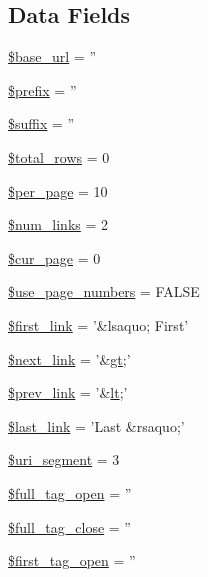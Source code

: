 \subsection*{Data Fields}
\begin{DoxyCompactItemize}
\item 
\hyperlink{class_c_i___pagination_a6886427c9c643f707fcb35c018049bc7}{\$base\-\_\-url} = ''
\item 
\hyperlink{class_c_i___pagination_a09e8cf95b9d29955a0bfabca9b420edc}{\$prefix} = ''
\item 
\hyperlink{class_c_i___pagination_a8a4ee1ac7ecdf8ef590598ad43b23e0a}{\$suffix} = ''
\item 
\hyperlink{class_c_i___pagination_af2c641e024ee7eeec68ae26c08ca2cf2}{\$total\-\_\-rows} = 0
\item 
\hyperlink{class_c_i___pagination_abece0f3099457a037f8f339811dc6e20}{\$per\-\_\-page} = 10
\item 
\hyperlink{class_c_i___pagination_aa04c33b46d7b63638408ac57ca3ee9e9}{\$num\-\_\-links} = 2
\item 
\hyperlink{class_c_i___pagination_a0114271d3cbbe963a73efe317e3512c7}{\$cur\-\_\-page} = 0
\item 
\hyperlink{class_c_i___pagination_ac19b7d290389a9188ca6466f85d14a85}{\$use\-\_\-page\-\_\-numbers} = F\-A\-L\-S\-E
\item 
\hyperlink{class_c_i___pagination_a0236d9345031b8c11db487560609f9a7}{\$first\-\_\-link} = '\&lsaquo; First'
\item 
\hyperlink{class_c_i___pagination_ae3962413e69384df902aedf7484ddefe}{\$next\-\_\-link} = '\&\hyperlink{mathquill_8js_afcd9bd0e48d31b4d384b46d471e50ab4}{gt};'
\item 
\hyperlink{class_c_i___pagination_afab5c29a3da82c4dce6a491f1d257831}{\$prev\-\_\-link} = '\&\hyperlink{mathquill_8js_ac2b9298bcc3d72ed2a56e0ba03bc909a}{lt};'
\item 
\hyperlink{class_c_i___pagination_ab10d1c6de63d2bc11a210c26e450b231}{\$last\-\_\-link} = 'Last \&rsaquo;'
\item 
\hyperlink{class_c_i___pagination_a79fd9718cc6c432f6919c28299584d77}{\$uri\-\_\-segment} = 3
\item 
\hyperlink{class_c_i___pagination_a75336a53727415578f78bd3d337c8559}{\$full\-\_\-tag\-\_\-open} = ''
\item 
\hyperlink{class_c_i___pagination_ad7e8fd7ace07539860b6f0b323aacbc8}{\$full\-\_\-tag\-\_\-close} = ''
\item 
\hyperlink{class_c_i___pagination_a5e352cfb5a6e9b6f850264aca68f00e0}{\$first\-\_\-tag\-\_\-open} = ''

\end{DoxyCompactItemize}
